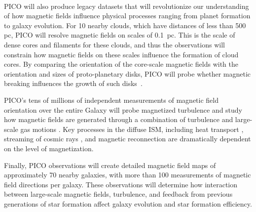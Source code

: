 \documentclass[PICOReport.tex]{subfiles}
\begin{document}

%
\\
PICO will also produce legacy datasets that will revolutionize our understanding of how magnetic fields influence physical processes ranging from planet formation to galaxy evolution.  For 10 nearby clouds, which have distances of less than 500 pc, PICO will resolve magnetic fields on scales of 0.1~pc. This is the scale of dense cores and filaments for these clouds, and thus the observations will constrain how magnetic fields on these scales influence the formation of cloud cores.  By comparing the orientation of the core-scale magnetic fields with the orientation and sizes of proto-planetary disks, PICO will probe whether magnetic breaking influences the growth of such disks~\citep{allen_2003,li_2014}. 

PICO's tens of millions of independent measurements of magnetic field orientation over the entire Galaxy will probe magnetized turbulence and study how magnetic fields are generated through a combination of turbulence and large-scale gas motions \citep{Xu_2018}.   Key processes in the diffuse ISM, including heat transport \citep{Lazarian:2006}, streaming of cosmic rays \citep{Lazarian:2016}, and magnetic reconnection \citep{Lazarian_Vishniac:1999} are dramatically dependent on the level of magnetization. 

Finally, PICO observations will create detailed magnetic field maps of approximately 70 nearby galaxies, with more than 100 measurements of magnetic field directions per galaxy. These observations will determine how interaction between large-scale magnetic fields, turbulence, and feedback from previous generations of star formation affect galaxy evolution and star formation efficiency.

%
%
\end{document}
